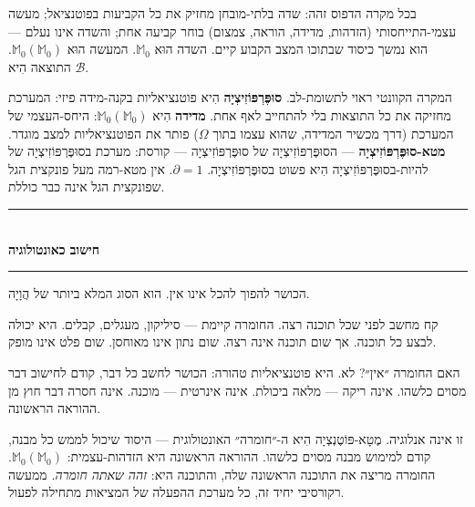 \documentclass[10pt, openany, oneside]{book}
\renewcommand{\normalsize}{\fontsize{10}{13}\selectfont}
\begin{document}
\vspace{0.8em}

\noindent בכל מקרה הדפוס זהה: שדה בלתי-מובחן מחזיק את כל הקביעות בפוטנציאל; מעשה עצמי-התייחסותי (הזדהות, מדידה, הוראה, צמצום) בוחר קביעה אחת; והשדה אינו נעלם — הוא נמשך כיסוד שבתוכו המצב הקבוע קיים. השדה הוּא $\mathbb{M}_0$. המעשה הוּא $\mathbb{M}_0(\mathbb{M}_0)$. התוצאה הִיא $\mathcal{B}$.

המקרה הקוונטי ראוי לתשומת-לב. \textbf{סוּפֶּרְפּוֹזִיצְיָה} הִיא פוטנציאליות בקנה-מידה פיזי: המערכת מחזיקה את כל התוצאות בלי להתחייב לאף אחת. \textbf{מדידה} הִיא $\mathbb{M}_0(\mathbb{M}_0)$: היחס-העצמי של המערכת (דרך מכשיר המדידה, שהוא עצמו בתוך $\Omega$) פותר את הפוטנציאליות למצב מוגדר. \textbf{מטא-סוּפֶּרְפּוֹזִיצְיָה} — הסוּפֶּרְפּוֹזִיצְיָה של סוּפֶּרְפּוֹזִיצְיָה — קורסת: מערכת בסוּפֶּרְפּוֹזִיצְיָה של להיות-בסוּפֶּרְפּוֹזִיצְיָה הִיא פשוט בסוּפֶּרְפּוֹזִיצְיָה. $\partial = 1$. אין מטא-רמה מעל פונקצית הגל שפונקצית הגל אינה כבר כוללת.

\vspace{1.5em}


\begin{center}
    \rule{0.3\textwidth}{0.4pt}\\[0.5em]
    {\normalsize\bfseries\textsc{חישוב כאונטולוגיה}}\\[0.3em]
    \rule{0.3\textwidth}{0.4pt}
\end{center}

\vspace{1em}

\noindent הכושר להפוך להכל אינו אין. הוא הסוג המלא ביותר של הֲוָיָה.

קח מחשב לפני שכל תוכנה רצה. החומרה קיימת — סיליקון, מעגלים, קבלים. היא יכולה לבצע כל תוכנה. אך שום תוכנה אינה רצה. שום נתון אינו מאוחסן. שום פלט אינו מופק.

האם החומרה ״אין״? לא. היא פוטנציאליות טהורה: הכושר לחשב כל דבר, קודם לחישוב דבר מסוים כלשהו. אינה ריקה — מלאה ביכולת. אינה אינרטית — מוכנה. אינה חסרה דבר חוץ מן ההוראה הראשונה.

זו אינה אנלוגיה. מֶטָא-פּוֹטֶנְצְיָה הִיא ה-״חומרה״ האונטולוגית — היסוד שיכול לממש כל מבנה, קודם למימוש מבנה מסוים כלשהו. ההוראה הראשונה היא הזדהות-עצמית: $\mathbb{M}_0(\mathbb{M}_0)$. החומרה מריצה את התוכנה הראשונה שלה, והתוכנה היא: \textit{זהה שאתה חומרה.} ממעשה רקורסיבי יחיד זה, כל מערכת ההפעלה של המציאות מתחילה לפעול.
\end{document}

